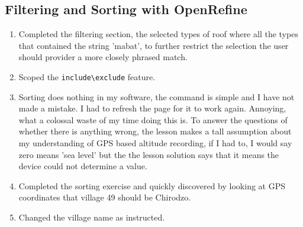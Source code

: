 \documentclass{article}
\begin{document}
\subsection{Filtering and Sorting with OpenRefine}
\begin{enumerate}
    \item Completed the filtering section, the selected types of roof where all the types that contained the string 'mabat', to further restrict the selection the user should provider a more closely phrased match.
    \item Scoped the \verb|include\exclude| feature.
    \item Sorting does nothing in my software, the command is simple and I have not made a mistake. I had to refresh the page for it to work again. Annoying, what a colossal waste of my time doing this is. To answer the questions of whether there is anything wrong, the lesson makes a tall assumption about my understanding of GPS based altitude recording, if I had to, I would say zero means 'sea level' but the the lesson solution says that it means the device could not determine a value. 
    \item Completed the sorting exercise and quickly discovered by looking at GPS coordinates that village 49 should be Chirodzo.
    \item Changed the village name as instructed.
\end{enumerate}
\end{document}
